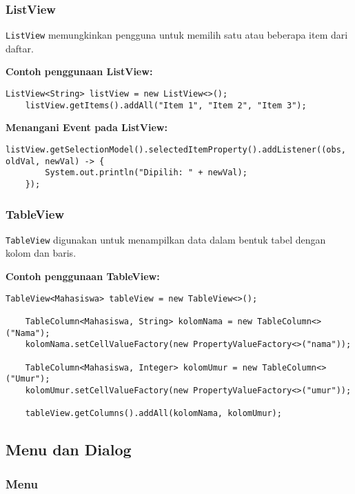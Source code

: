 \subsubsection{ListView}

\texttt{ListView} memungkinkan pengguna untuk memilih satu atau beberapa item dari daftar.

\textbf{Contoh penggunaan ListView:}
\begin{lstlisting}[style=JavaStyle, caption=Membuat ListView dalam JavaFX]
	ListView<String> listView = new ListView<>();
	listView.getItems().addAll("Item 1", "Item 2", "Item 3");
\end{lstlisting}

\textbf{Menangani Event pada ListView:}
\begin{lstlisting}[style=JavaStyle, caption=Mengambil Pilihan dari ListView]
	listView.getSelectionModel().selectedItemProperty().addListener((obs, oldVal, newVal) -> {
		System.out.println("Dipilih: " + newVal);
	});
\end{lstlisting}

\subsubsection{TableView}

\texttt{TableView} digunakan untuk menampilkan data dalam bentuk tabel dengan kolom dan baris.

\textbf{Contoh penggunaan TableView:}
\begin{lstlisting}[style=JavaStyle, caption=Membuat TableView dalam JavaFX]
	TableView<Mahasiswa> tableView = new TableView<>();
	
	TableColumn<Mahasiswa, String> kolomNama = new TableColumn<>("Nama");
	kolomNama.setCellValueFactory(new PropertyValueFactory<>("nama"));
	
	TableColumn<Mahasiswa, Integer> kolomUmur = new TableColumn<>("Umur");
	kolomUmur.setCellValueFactory(new PropertyValueFactory<>("umur"));
	
	tableView.getColumns().addAll(kolomNama, kolomUmur);
\end{lstlisting}

\subsection{Menu dan Dialog}

\subsubsection{Menu}

